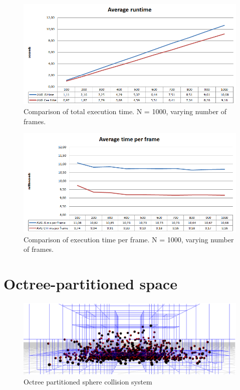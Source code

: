 \begin{figure}[h!]
  \caption{Comparison of total execution time. N = 1000, varying number of frames.}
  \label{img:spheres1-time-total}
  \centering
	\includegraphics[width=16cm]{spheres/time-total.png}
\end{figure} 
\begin{figure}[h!]
  \caption{Comparison of execution time per frame. N = 1000, varying number of frames.}
  \label{img:spheres1-time-per-frame}
  \centering
	\includegraphics[width=16cm]{spheres/time-per-frame.png}
\end{figure}

\section{Octree-partitioned space}
\label{sec:sphereoctree}

\begin{figure}[h!]
  \caption{Octree partitioned sphere collision system}
  \label{img:spheres}
  \centering
	\includegraphics[width=16cm]{spheres/render2.png}
\end{figure}

